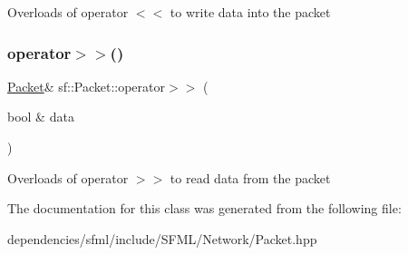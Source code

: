 Overloads of operator $<$$<$ to write data into the packet \mbox{\label{classsf_1_1_packet_af8e26c63ba9bdccd262565ff0d3eeba2}} 
\subsubsection{\texorpdfstring{operator$>$$>$()}{operator>>()}}
{\footnotesize\ttfamily \hyperlink{classsf_1_1_packet}{Packet}\& sf\+::\+Packet\+::operator$>$$>$ (\begin{DoxyParamCaption}\item[{bool \&}]{data }\end{DoxyParamCaption})}

Overloads of operator $>$$>$ to read data from the packet 

The documentation for this class was generated from the following file\+:\begin{DoxyCompactItemize}
\item 
dependencies/sfml/include/\+S\+F\+M\+L/\+Network/Packet.\+hpp\end{DoxyCompactItemize}
